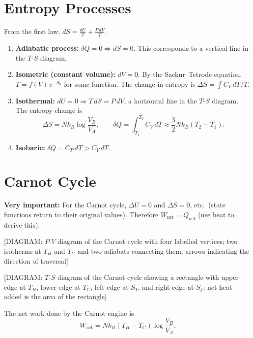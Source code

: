 \section{Entropy Processes}

From the first law, $dS = \frac{dU}{T} + \frac{P\,dV}{T}$.

\begin{enumerate}
    \item \textbf{Adiabatic process:} $\delta Q = 0 \Rightarrow dS = 0$. This corresponds to a vertical line in the $T$-$S$ diagram.
    \item \textbf{Isometric (constant volume):} $dV = 0$. By the Sackur--Tetrode equation, $T = f(V)\,e^{-S_0}$ for some function. The change in entropy is $\Delta S = \int C_V\,dT/T$.
    \item \textbf{Isothermal:} $dU = 0 \Rightarrow T\,dS = P\,dV$, a horizontal line in the $T$-$S$ diagram. The entropy change is
    \begin{equation}
        \Delta S = Nk_B\log\frac{V_B}{V_A}, \qquad \delta Q = \int_{T_1}^{T_0} C_V\,dT \approx \frac{3}{2}Nk_B(T_2 - T_1).
    \end{equation}
    \item \textbf{Isobaric:} $\delta Q = C_P\,dT > C_V\,dT$.
\end{enumerate}

\section{Carnot Cycle}

\textbf{Very important:} For the Carnot cycle, $\Delta U = 0$ and $\Delta S = 0$, etc.\ (state functions return to their original values). Therefore $W_{\text{net}} = Q_{\text{net}}$ (use heat to derive this).

\begin{center}[DIAGRAM: $P$-$V$ diagram of the Carnot cycle with four labelled vertices; two isotherms at $T_H$ and $T_C$ and two adiabats connecting them; arrows indicating the direction of traversal]\end{center}

\begin{center}[DIAGRAM: $T$-$S$ diagram of the Carnot cycle showing a rectangle with upper edge at $T_H$, lower edge at $T_C$, left edge at $S_1$, and right edge at $S_f$; net heat added is the area of the rectangle]\end{center}

The net work done by the Carnot engine is
\begin{equation}
    W_{\text{net}} = Nk_B(T_H - T_C)\log\frac{V_B}{V_A}.
\end{equation}

